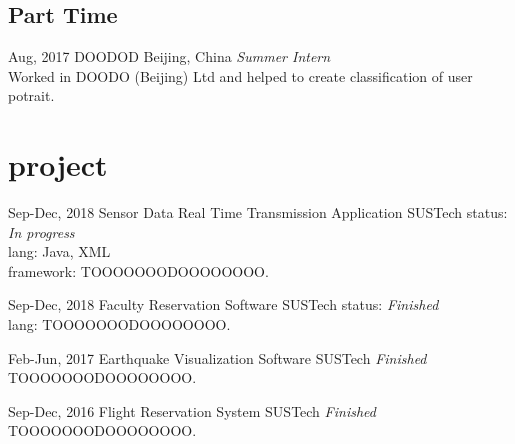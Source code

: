 \documentclass[]{friggeri-cv-a4}
\begin{document}

\subsection{Part Time}

\begin{entrylist}

\entry
{Aug, 2017}
{DOODOD}
{Beijing, China}
{\emph{Summer Intern} \\
Worked in DOODO (Beijing) Ltd and helped to create classification of user potrait.}




\end{entrylist}


\section{project}

\begin{entrylist}


\entry
{Sep-Dec, 2018}
{Sensor Data Real Time Transmission Application}
{SUSTech}
{
    status: \emph{In progress}\\
    lang: Java, XML\\
    framework:
    TOOOOOOODOOOOOOOO.
}


\entry
{Sep-Dec, 2018}
{Faculty Reservation Software}
{SUSTech}
{
    status: \emph{Finished}\\
    lang:
TOOOOOOODOOOOOOOO.}


\entry
{Feb-Jun, 2017}
{Earthquake Visualization Software}
{SUSTech}
{\emph{Finished}\\
TOOOOOOODOOOOOOOO.}


\entry
{Sep-Dec, 2016}
{Flight Reservation System}
{SUSTech}
{\emph{Finished}\\
TOOOOOOODOOOOOOOO.}


\end{entrylist}
\end{document}
